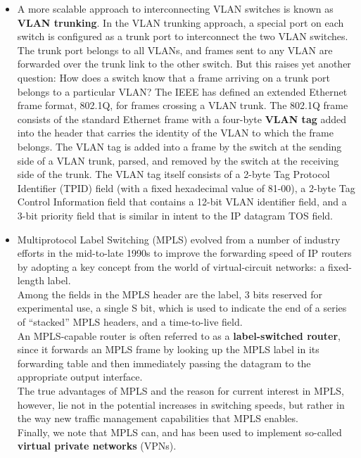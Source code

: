 \begin{itemize}
\item
A more scalable approach to interconnecting VLAN switches is known as \textbf{VLAN trunking}. In the VLAN trunking approach, a special port on each switch is configured as a trunk port to interconnect the two VLAN switches. The trunk port belongs to all VLANs, and frames sent to any VLAN are forwarded over the trunk link to the other switch. But this raises yet another question: How does a switch know that a frame arriving on a trunk port belongs to a particular VLAN? The IEEE has defined an extended Ethernet frame format, 802.1Q, for frames crossing a VLAN trunk. The 802.1Q frame consists of the standard Ethernet frame with a four-byte \textbf{VLAN tag} added into the header that carries the identity of the VLAN to which the frame belongs. The VLAN tag is added into a frame by the switch at the sending side of a VLAN trunk, parsed, and removed by the switch at the receiving side of the trunk. The VLAN tag itself consists of a 2-byte Tag Protocol Identifier (TPID) field (with a fixed hexadecimal value of 81-00), a 2-byte Tag Control Information field that contains a 12-bit VLAN identifier field, and a 3-bit priority field that is similar in intent to the IP datagram TOS field.

\item
Multiprotocol Label Switching (MPLS) evolved from a number of industry efforts in the mid-to-late 1990s to improve the forwarding speed of IP routers by adopting a key concept from the world of virtual-circuit networks: a fixed-length label.\\
Among the fields in the MPLS header are the label, 3 bits reserved for experimental use, a single S bit, which is used to indicate the end of a series of ``stacked'' MPLS headers, and a time-to-live field.\\
An MPLS-capable router is often referred to as a \textbf{label-switched router}, since it forwards an MPLS frame by looking up the MPLS label in its forwarding table and then immediately passing the datagram to the appropriate output interface.\\
The true advantages of MPLS and the reason for current interest in MPLS, however, lie not in the potential increases in switching speeds, but rather in the way new traffic management capabilities that MPLS enables.\\
Finally, we note that MPLS can, and has been used to implement so-called \textbf{virtual private networks} (VPNs).


\end{itemize}
